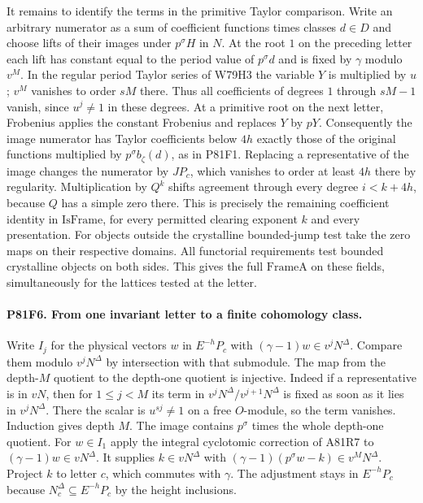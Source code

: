 It remains to identify the terms in the primitive Taylor comparison.
Write an arbitrary numerator as a sum of coefficient functions
times classes $d\in D$ and choose lifts of their images under
$p^\sigma H$ in $N$. At the root $1$ on the preceding letter
each lift has constant equal to the period value of $p^\sigma d$
and is fixed by $\gamma$ modulo $v^M$. In the regular period
Taylor series of W79H3 the variable $Y$ is multiplied by $u$;
$v^M$ vanishes to order $sM$ there. Thus all coefficients of
degrees $1$ through $sM-1$ vanish, since $u^j\ne1$ in these
degrees. At a primitive root on the next letter, Frobenius
applies the constant Frobenius and replaces $Y$ by $pY$.
Consequently the image numerator has Taylor coefficients below
$4h$ exactly those of the original functions multiplied by
$p^\sigma b_\zeta(d)$, as in P81F1. Replacing a representative
of the image changes the numerator by $J P_c$, which vanishes
to order at least $4h$ there by regularity. Multiplication by
$Q^k$ shifts agreement through every degree $i<k+4h$, because
$Q$ has a simple zero there. This is precisely the remaining
coefficient identity in $\mathrm{IsFrame}$, for every permitted
clearing exponent $k$ and every presentation. For objects outside
the crystalline bounded-jump test take the zero maps on their
respective domains. All functorial requirements test bounded
crystalline objects on both sides. This gives the full
$\mathrm{FrameA}$ on these fields, simultaneously for the lattices
tested at the letter.

\paragraph{P81F6. From one invariant letter to a finite cohomology class.}
Write $I_j$ for the physical vectors $w$ in $E^{-h}P_c$ with
$(\gamma-1)w\in v^j N^\Delta$. Compare them modulo $v^jN^\Delta$
by intersection with that submodule. The map from the depth-$M$
quotient to the depth-one quotient is injective. Indeed if a
representative is in $vN$, then for $1\le j<M$ its term in
$v^jN^\Delta/v^{j+1}N^\Delta$ is fixed as soon as it lies in
$v^jN^\Delta$. There the scalar is $u^{sj}\ne1$ on a free
$O$-module, so the term vanishes. Induction gives depth $M$.
The image contains $p^\sigma$ times the whole depth-one quotient.
For $w\in I_1$ apply the integral cyclotomic correction of A81R7
to $(\gamma-1)w\in vN^\Delta$. It supplies $k\in vN^\Delta$
with $(\gamma-1)(p^\sigma w-k)\in v^MN^\Delta$.
Project $k$ to letter $c$, which commutes with $\gamma$. The
adjustment stays in $E^{-h}P_c$ because $N_c^\Delta\subseteq
E^{-h}P_c$ by the height inclusions.

